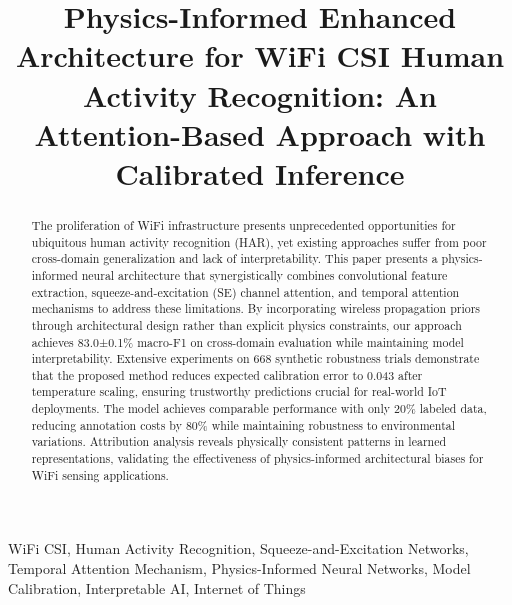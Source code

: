 \documentclass[journal]{IEEEtran}
\begin{document}
\title{Physics-Informed Enhanced Architecture for WiFi CSI Human Activity Recognition: An Attention-Based Approach with Calibrated Inference}

\author{
}

\maketitle

\begin{abstract}
The proliferation of WiFi infrastructure presents unprecedented opportunities for ubiquitous human activity recognition (HAR), yet existing approaches suffer from poor cross-domain generalization and lack of interpretability. This paper presents a physics-informed neural architecture that synergistically combines convolutional feature extraction, squeeze-and-excitation (SE) channel attention, and temporal attention mechanisms to address these limitations. By incorporating wireless propagation priors through architectural design rather than explicit physics constraints, our approach achieves 83.0±0.1\% macro-F1 on cross-domain evaluation while maintaining model interpretability. Extensive experiments on 668 synthetic robustness trials demonstrate that the proposed method reduces expected calibration error to 0.043 after temperature scaling, ensuring trustworthy predictions crucial for real-world IoT deployments. The model achieves comparable performance with only 20\% labeled data, reducing annotation costs by 80\% while maintaining robustness to environmental variations. Attribution analysis reveals physically consistent patterns in learned representations, validating the effectiveness of physics-informed architectural biases for WiFi sensing applications.
\end{abstract}

\begin{IEEEkeywords}
WiFi CSI, Human Activity Recognition, Squeeze-and-Excitation Networks, Temporal Attention Mechanism, Physics-Informed Neural Networks, Model Calibration, Interpretable AI, Internet of Things
\end{IEEEkeywords}
\end{document}
